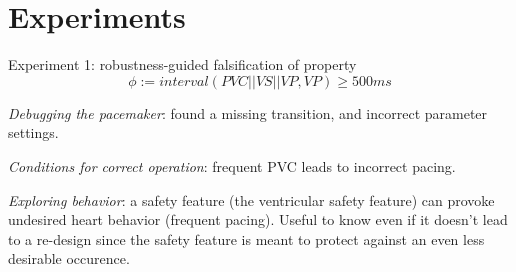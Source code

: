 \section{Experiments}
\label{experiments}
Experiment 1: robustness-guided falsification of property
\[\phi := interval(PVC || VS ||VP, VP) \geq 500ms \]

\emph{Debugging the pacemaker}: found a missing transition, and incorrect parameter settings.

\emph{Conditions for correct operation}: frequent PVC leads to incorrect pacing.

\emph{Exploring behavior}: a safety feature (the ventricular safety feature) can provoke undesired heart behavior (frequent pacing). Useful to know even if it doesn't lead to a re-design since the safety feature is meant to protect against an even less desirable occurence. 
